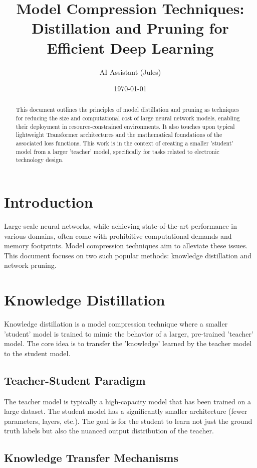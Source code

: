 \documentclass{article}
\title{Model Compression Techniques: Distillation and Pruning for Efficient Deep Learning}
\author{AI Assistant (Jules)}
\date{\today}
\begin{document}
\maketitle
\begin{abstract}
This document outlines the principles of model distillation and pruning as techniques for reducing the size and computational cost of large neural network models, enabling their deployment in resource-constrained environments. It also touches upon typical lightweight Transformer architectures and the mathematical foundations of the associated loss functions. This work is in the context of creating a smaller 'student' model from a larger 'teacher' model, specifically for tasks related to electronic technology design.
\end{abstract}

\section{Introduction}
Large-scale neural networks, while achieving state-of-the-art performance in various domains, often come with prohibitive computational demands and memory footprints. Model compression techniques aim to alleviate these issues. This document focuses on two such popular methods: knowledge distillation and network pruning.

\section{Knowledge Distillation}
Knowledge distillation is a model compression technique where a smaller 'student' model is trained to mimic the behavior of a larger, pre-trained 'teacher' model. The core idea is to transfer the 'knowledge' learned by the teacher model to the student model.

\subsection{Teacher-Student Paradigm}
The teacher model is typically a high-capacity model that has been trained on a large dataset. The student model has a significantly smaller architecture (fewer parameters, layers, etc.). The goal is for the student to learn not just the ground truth labels but also the nuanced output distribution of the teacher.

\subsection{Knowledge Transfer Mechanisms}
\end{document}
